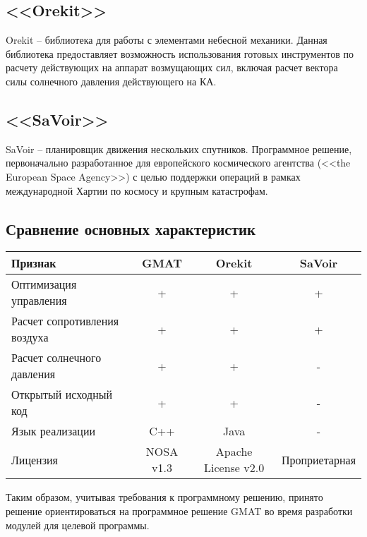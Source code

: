\subsection{<<Orekit>>}
\noindent\indent Orekit -- библиотека для работы с элементами небесной механики.
Данная библиотека предоставляет возможность использования готовых инструментов по расчету
действующих на аппарат возмущающих сил, включая расчет вектора силы солнечного давления
действующего на КА.
\subsection{<<SaVoir>>}
\noindent\indent SaVoir -- планировщик движения нескольких спутников. Программное
решение, первоначально разработанное для европейского космического агентства
(<<the European Space Agency>>) с целью поддержки операций в рамках международной
Хартии по космосу и крупным катастрофам.
\subsection{Сравнение основных характеристик}
\begin{tabular}{|l|c|c|c|}
  \hline
  Признак                      & GMAT                            & Orekit              & SaVoir \\ \hline
  Оптимизация управления       & +                               & +                   & +      \\ \hline
  Расчет сопротивления воздуха & +                               & +                   & +      \\ \hline
  Расчет солнечного давления   & +                               & +                   & -      \\ \hline
  Открытый исходный код        & +                               & +                   & -      \\ \hline
  Язык реализации              & C++                             & Java                & -      \\ \hline
  Лицензия                     & NOSA v1.3 & Apache License v2.0 & Проприетарная \\ \hline
\end{tabular}\par
Таким образом, учитывая требования к программному решению, принято решение
ориентироваться на программное решение GMAT во время разработки модулей для целевой программы.
